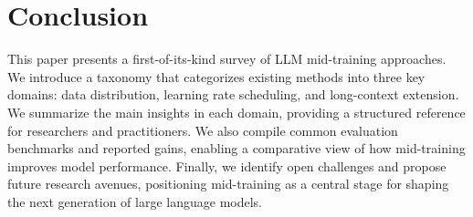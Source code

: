 
\section{Conclusion}
\label{sec:conclusion}




This paper presents a first-of-its-kind survey of LLM mid-training approaches. We introduce a taxonomy that categorizes existing methods into three key domains: data distribution, learning rate scheduling, and long-context extension. We summarize the main insights in each domain, providing a structured reference for researchers and practitioners. We also compile common evaluation benchmarks and reported gains, enabling a comparative view of how mid-training improves model performance. Finally, we identify open challenges and propose future research avenues, positioning mid-training as a central stage for shaping the next generation of large language models.